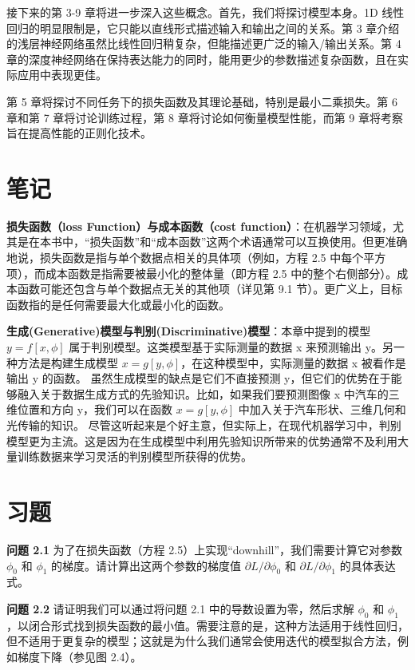 \documentclass[lang=cn,newtx,10pt,scheme=chinese]{elegantbook}
\begin{document}
接下来的第 3-9 章将进一步深入这些概念。首先，我们将探讨模型本身。1D 线性回归的明显限制是，它只能以直线形式描述输入和输出之间的关系。第 3 章介绍的浅层神经网络虽然比线性回归稍复杂，但能描述更广泛的输入/输出关系。第 4 章的深度神经网络在保持表达能力的同时，能用更少的参数描述复杂函数，且在实际应用中表现更佳。

第 5 章将探讨不同任务下的损失函数及其理论基础，特别是最小二乘损失。第 6 章和第 7 章将讨论训练过程，第 8 章将讨论如何衡量模型性能，而第 9 章将考察旨在提高性能的正则化技术。

\section{笔记}

\textbf{损失函数（loss Function）与成本函数（cost function）}：在机器学习领域，尤其是在本书中，“损失函数”和“成本函数”这两个术语通常可以互换使用。但更准确地说，损失函数是指与单个数据点相关的具体项（例如，方程 2.5 中每个平方项），而成本函数是指需要被最小化的整体量（即方程 2.5 中的整个右侧部分）。成本函数可能还包含与单个数据点无关的其他项（详见第 9.1 节）。更广义上，目标函数指的是任何需要最大化或最小化的函数。

\textbf{生成(Generative)模型与判别(Discriminative)模型}：本章中提到的模型 $y = f[x, \phi]$ 属于判别模型。这类模型基于实际测量的数据 x 来预测输出 y。另一种方法是构建生成模型 $x = g[y, \phi]$，在这种模型中，实际测量的数据 x 被看作是输出 y 的函数。
虽然生成模型的缺点是它们不直接预测 y，但它们的优势在于能够融入关于数据生成方式的先验知识。比如，如果我们要预测图像 x 中汽车的三维位置和方向 y，我们可以在函数 $x = g[y, \phi]$ 中加入关于汽车形状、三维几何和光传输的知识。
尽管这听起来是个好主意，但实际上，在现代机器学习中，判别模型更为主流。这是因为在生成模型中利用先验知识所带来的优势通常不及利用大量训练数据来学习灵活的判别模型所获得的优势。

\section{习题}

\textbf{问题 2.1} 为了在损失函数（方程 2.5）上实现“downhill”，我们需要计算它对参数 $\phi_0$ 和 $\phi_1$ 的梯度。请计算出这两个参数的梯度值 $\partial L / \partial \phi_0$ 和 $\partial L / \partial \phi_1$ 的具体表达式。

\textbf{问题 2.2} 请证明我们可以通过将问题 2.1 中的导数设置为零，然后求解 $\phi_0$ 和 $\phi_1$，以闭合形式找到损失函数的最小值。需要注意的是，这种方法适用于线性回归，但不适用于更复杂的模型；这就是为什么我们通常会使用迭代的模型拟合方法，例如梯度下降（参见图 2.4）。
\end{document}
